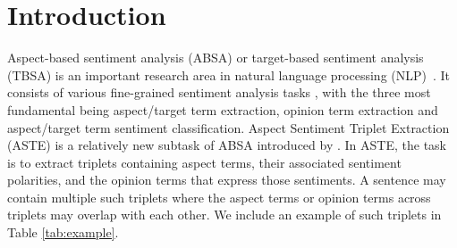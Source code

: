 \documentclass[sigconf]{acmart}
\begin{document}
\section{Introduction}







Aspect-based sentiment analysis (ABSA) or target-based sentiment analysis (TBSA) is an important research area in natural language processing (NLP)~\cite{poria2020beneath, duan2021survey}. It consists of various fine-grained sentiment analysis tasks \cite{nasukawa2003sentiment, liu2010sentiment, liu2012sentiment}, with the three most fundamental being aspect/target term extraction, opinion term extraction and aspect/target term sentiment classification. Aspect Sentiment Triplet Extraction (ASTE) is a relatively new subtask of ABSA introduced by \citet{Li2019Unified,peng2020knowing}. In ASTE, the task is to extract triplets containing aspect terms, their associated sentiment polarities, and the opinion terms that express those sentiments. A sentence may contain multiple such triplets where the aspect terms or opinion terms across triplets may overlap with each other. We include an example of such triplets in Table \ref{tab:example}.
\end{document}
